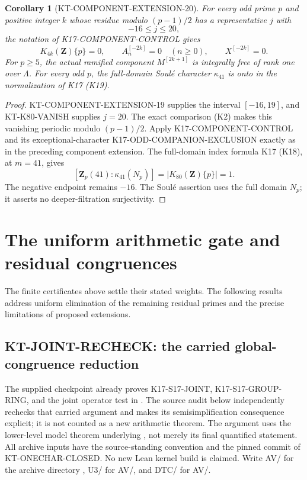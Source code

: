 \documentclass[11pt,a4paper]{article}
\newtheorem{corollary}[theorem]{Corollary}
\theoremstyle{definition}
\begin{document}
\begin{corollary}[KT-COMPONENT-EXTENSION-20]
For every odd prime $p$ and positive integer $k$ whose residue
modulo $(p-1)/2$ has a representative $j$ with
\[
                              -16\leq j\leq20,
\]
the notation of K17-COMPONENT-CONTROL gives
\[
 K_{4k}(\mathbf Z)\{p\}=0,\qquad
 A_n^{[-2k]}=0\quad(n\geq0),\qquad X^{[-2k]}=0.
\]
For $p\geq5$, the actual ramified component $M^{[2k+1]}$
is integrally free of rank one over $\Lambda$.
For every odd $p$, the full-domain Soul\'e character
$\kappa_{41}$ is onto in the normalization of K17 (K19).
\end{corollary}
\begin{proof}
KT-COMPONENT-EXTENSION-19 supplies the interval $[-16,19]$,
and KT-K80-VANISH supplies $j=20$.
The exact comparison (K2) makes this vanishing periodic
modulo $(p-1)/2$.  Apply K17-COMPONENT-CONTROL and its
exceptional-character K17-ODD-COMPANION-EXCLUSION exactly
as in the preceding component extension.  The full-domain
index formula K17 (K18), at $m=41$, gives
\[
 [\mathbf Z_p(41):\kappa_{41}(N_p)]
                  =|K_{80}(\mathbf Z)\{p\}|=1.
\]
The negative endpoint remains $-16$.  The Soul\'e assertion
uses the full domain $N_p$; it asserts no deeper-filtration
surjectivity.
\end{proof}



\section{The uniform arithmetic gate and residual congruences}

The finite certificates above settle their stated weights.
The following results address uniform elimination of the remaining
residual primes and the precise limitations of proposed extensions.



\subsection{KT-JOINT-RECHECK: the carried global-congruence reduction}
\label{sec:kt-global-residual}

The supplied checkpoint already proves K17-S17-JOINT,
K17-S17-GROUP-RING, and the joint operator test in
.
The source audit below independently rechecks that carried
argument and makes its semisimplification consequence explicit;
it is not counted as a new arithmetic theorem. The argument
uses the lower-level model theorem underlying
, not merely its final quantified statement.
All archive inputs have the source-standing convention and the
pinned commit of KT-ONECHAR-CLOSED. No new Lean kernel build is
claimed. Write AV/ for the archive directory
,
U3/ for AV/, and DTC/ for
AV/.
\end{document}

